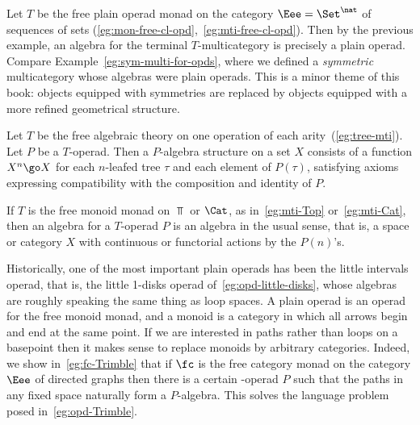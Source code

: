 \begin{example}	%
%
%
Let $T$ be the free plain operad monad on the category $\Eee=\Set^\nat$ of
sequences of sets (\ref{eg:mon-free-cl-opd},~\ref{eg:mti-free-cl-opd}).
Then by the previous example, an algebra for the terminal $T$-multicategory
is precisely a plain operad.  Compare Example~\ref{eg:sym-multi-for-opds},
where we defined a \emph{symmetric}%
%
%
%
%
multicategory whose algebras were plain operads.  This is a minor theme of
this book: objects equipped with symmetries are replaced by objects
equipped with a more refined geometrical structure.
\end{example}


\begin{example}%
%
%
Let $T$ be the free algebraic theory on one operation of each
arity~(\ref{eg:tree-mti}).  Let $P$ be a $T$-operad.  Then a $P$-algebra
structure on a set $X$ consists of a function $X^n \go X$ for each
$n$-leafed tree%
%
%
$\tau$ and each element of $P(\tau)$, satisfying axioms
expressing compatibility with the composition and identity of $P$.
\end{example}


\begin{example}
If $T$ is the free monoid monad on $\Top$%
%
%
or $\Cat$,%
%
%
as in~\ref{eg:mti-Top}
or~\ref{eg:mti-Cat}, then an algebra for a $T$-operad $P$ is an algebra in
the usual sense, that is, a space or category $X$ with continuous or
functorial actions%
%
%
%
%
by the $P(n)$'s.
\end{example}


\begin{example}	
Historically, one of the most important plain operads has been the little%
%
%
intervals operad, that is, the little 1-disks operad
of~\ref{eg:opd-little-disks}, whose algebras are roughly speaking the same
thing as loop spaces.  A plain operad is an operad for the free monoid
monad, and a monoid is a category in which all arrows begin and end at the
same point.  If we are interested in paths%
%
%
rather than loops on a basepoint
then it makes sense to replace monoids by arbitrary categories.  Indeed, we
show in~\ref{eg:fc-Trimble} that if $\fc$ is the free category monad on the
category $\Eee$ of directed graphs then there is a certain \fc-operad%
%
%
$P$
such that the paths in any fixed space naturally form a $P$-algebra.  This
solves the language problem posed in~\ref{eg:opd-Trimble}.
\end{example}

